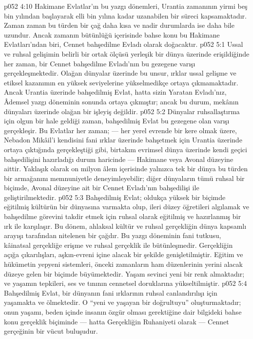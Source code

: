 \vs p052 4:10 Hakimane Evlatlar’ın bu yazgı dönemleri, Urantia zamanının yirmi beş bin yılından başlayarak elli bin yılına kadar uzanabilen bir süreci kapsamaktadır. Zaman zaman bu türden bir çağ daha kısa ve nadir durumlarda ise daha bile uzundur. Ancak zamanın bütünlüğü içerisinde bahse konu bu Hakimane Evlatları’ndan biri, Cennet bahşedilme Evladı olarak doğacaktır.
\vs p052 5:1 Ussal ve ruhsal gelişimin belirli bir ortak ölçüsü yerleşik bir dünya üzerinde erişildiğinde her zaman, bir Cennet bahşedilme Evladı’nın bu gezegene varışı gerçekleşmektedir. Olağan dünyalar üzerinde bu unsur, ırklar ussal gelişme ve etiksel kazanımın en yüksek seviyelerine yükselmedikçe ortaya çıkmamaktadır. Ancak Urantia üzerinde bahşedilmiş Evlat, hatta sizin Yaratan Evladı’nız, Âdemsel yazgı döneminin sonunda ortaya çıkmıştır; ancak bu durum, mekânın dünyaları üzerinde olağan bir işleyiş değildir.
\vs p052 5:2 Dünyalar ruhsallaştırma için olgun bir hale geldiği zaman, bahşedilmiş Evlat bu gezegene olan varışı gerçekleşir. Bu Evlatlar her zaman; --- her yerel evrende bir kere olmak üzere, Nebadon Mikâil’i kendisini fani ırklar üzerinde bahşetmek için Urantia üzerinde ortaya çıktığında gerçekleştiği gibi, birtakım evrimsel dünya üzerinde kendi geçici bahşedilişini hazırladığı durum haricinde --- Hakimane veya Avonal düzeyine aittir. Yaklaşık olarak on milyon âlem içerisinde yalnızca tek bir dünya bu türden bir armağanını memnuniyetle deneyimleyebilir; diğer dünyaların tümü ruhsal bir biçimde, Avonal düzeyine ait bir Cennet Evladı’nın bahşedilişi ile geliştirilmektedir.
\vs p052 5:3 Bahşedilmiş Evlat; oldukça yüksek bir biçimde eğitilmiş kültürün bir dünyasına varmakta olup, ileri düzey öğretileri algılamak ve bahşedilme görevini takdir etmek için ruhsal olarak eğitilmiş ve hazırlanmış bir ırk ile karşılaşır. Bu dönem, ahlaksal kültür ve ruhsal gerçekliğin dünya kapsamlı arayışı tarafından nitelenen bir çağdır. Bu yazgı döneminin fani tutkusu, kâinatsal gerçekliğe erişme ve ruhsal gerçeklik ile bütünleşmedir. Gerçekliğin açığa çıkarılışları, aşkın\hyp{}evreni içine alacak bir şekilde genişletilmiştir. Eğitim ve hükümetin yepyeni sistemleri, önceki zamanların ham düzenlerinin yerini alacak düzeye gelen bir biçimde büyümektedir. Yaşam sevinci yeni bir renk almaktadır; ve yaşamın tepkileri, ses ve tınının cennetsel doruklarına yükseltilmiştir.
\vs p052 5:4 Bahşedilmiş Evlat, bir dünyanın fani ırklarının ruhsal canlandırılışı için yaşamakta ve ölmektedir. O “yeni ve yaşayan bir doğrultuyu” oluşturmaktadır; onun yaşamı, beden içinde insanın özgür olması gerektiğine dair bilgideki bahse konu gerçeklik biçiminde --- hatta Gerçekliğin Ruhaniyeti olarak --- Cennet gerçeğinin bir vücut buluşudur.
